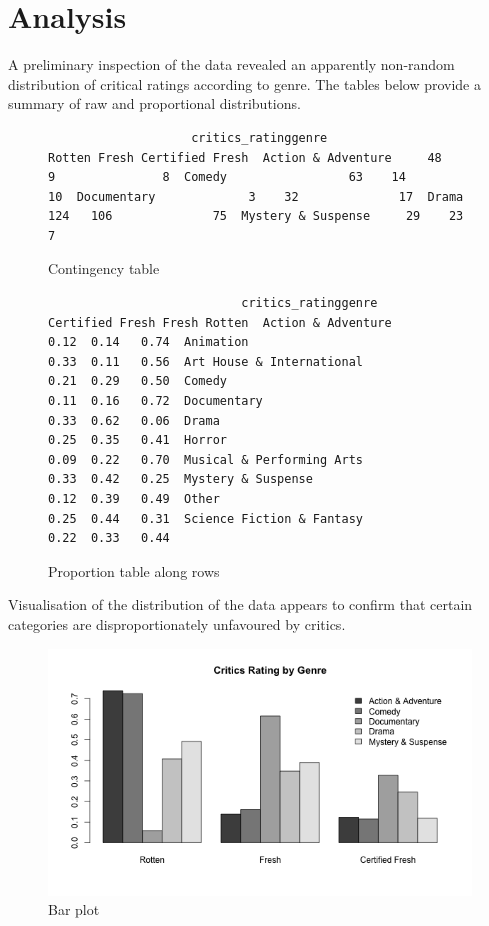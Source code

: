 \documentclass[12pt,a4paper]{article}
\begin{document}
	\section*{Analysis}
	A preliminary inspection of the data revealed an apparently non-random distribution of critical ratings according to genre. The tables below provide a summary of raw and proportional distributions.
	\begin{figure}
			\begin{verbatim}
                    critics_ratinggenre                Rotten Fresh Certified Fresh  Action & Adventure     48     9               8  Comedy                 63    14              10  Documentary             3    32              17  Drama                 124   106              75  Mystery & Suspense     29    23               7
			\end{verbatim}
		\caption{\footnotesize Contingency table}
	\end{figure}
	\begin{figure}
			\begin{verbatim}
                           critics_ratinggenre                       Certified Fresh Fresh Rotten  Action & Adventure                   0.12  0.14   0.74  Animation                            0.33  0.11   0.56  Art House & International            0.21  0.29   0.50  Comedy                               0.11  0.16   0.72  Documentary                          0.33  0.62   0.06  Drama                                0.25  0.35   0.41  Horror                               0.09  0.22   0.70  Musical & Performing Arts            0.33  0.42   0.25  Mystery & Suspense                   0.12  0.39   0.49  Other                                0.25  0.44   0.31  Science Fiction & Fantasy            0.22  0.33   0.44
			\end{verbatim}
		\caption{\footnotesize Proportion table along rows}
	\end{figure}

Visualisation of the distribution of the data appears to confirm that certain categories are disproportionately unfavoured by critics.

\begin{figure}[h!]\centering
	\caption{\footnotesize Bar plot}
	\includegraphics[width=.75\textwidth]{barplot.png}
\end{figure} 
\end{document}
